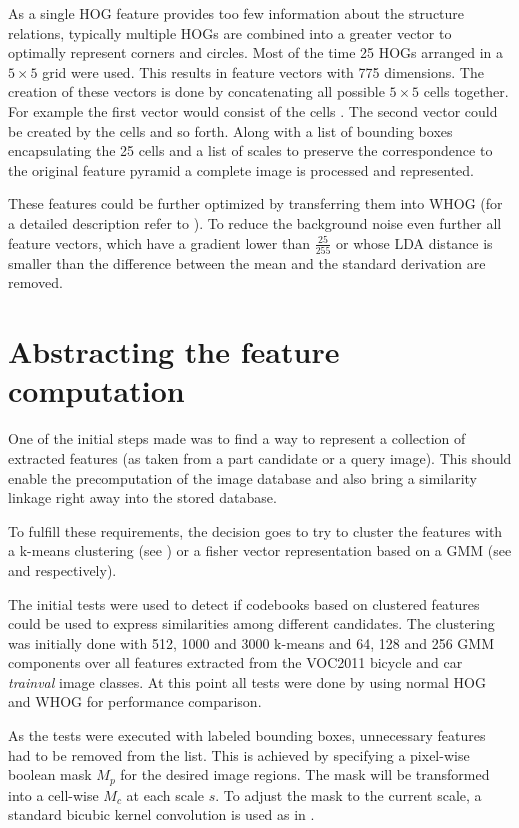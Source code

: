 As a single \ac{HOG} feature provides too few information about the structure relations, typically multiple \acp{HOG} are combined into a greater vector to optimally represent corners and circles. Most of the time 25 \acp{HOG} arranged in a $5\times5$ grid were used. This results in feature vectors with 775 dimensions. The creation of these vectors is done by concatenating all possible $5\times5$ cells together. For example the first vector would consist of the cells . The second vector could be created by the cells  and so forth. Along with a list of bounding boxes encapsulating the 25 cells and a list of scales to preserve the correspondence to the original feature pyramid a complete image is processed and represented.
\par
These features could be further optimized by transferring them into \ac{WHOG} (for a detailed description refer to ). To reduce the background noise even further all feature vectors, which have a gradient lower than $\frac{25}{255}$ or whose \ac{LDA} distance is smaller than the difference between the mean and the standard derivation are removed.

\section{Abstracting the feature computation}

One of the initial steps made was to find a way to represent a collection of extracted features (as taken from a part candidate or a query image). This should enable the precomputation of the image database and also bring a similarity linkage right away into the stored database.

To fulfill these requirements, the decision goes to try to cluster the features with a k-means clustering (see ) or a fisher vector representation based on a \acf{GMM} (see  and  respectively).
\par
The initial tests were used to detect if codebooks based on clustered features could be used to express similarities among different candidates.
The clustering was initially done with 512, 1000 and 3000 k-means and 64, 128 and 256 \ac{GMM} components over all features extracted from the \ac{VOC2011} bicycle and car \textit{trainval} image classes.
At this point all tests were done by using normal \ac{HOG} and \acl{WHOG} for performance comparison.
\par
As the tests were executed with labeled bounding boxes, unnecessary features had to be removed from the list. This is achieved by specifying a pixel-wise boolean mask $M_p$ for the desired image regions. The mask will be transformed into a cell-wise $M_c$ at each scale $s$. To adjust the mask to the current scale, a standard bicubic kernel convolution is used as in .

